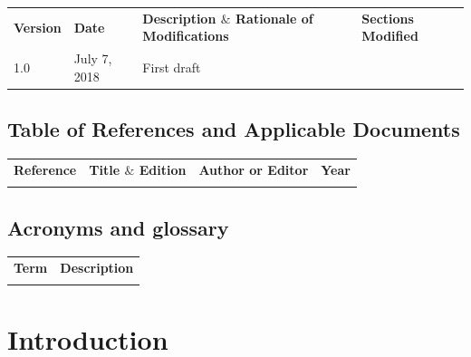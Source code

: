 \documentclass[12pt]{article}
\begin{document}
\begin{table}[H]
\large
\centering
\begin{adjustbox}{width=\textwidth}
\begin{tabular}{ |p{1.5cm}|p{2.5cm}|p{9.0cm}|p{3.0cm}| }
\hhline{----}
\textbf{Version} & \textbf{Date} & \textbf{Description  $  \&  $  Rationale of
Modifications} & \textbf{Sections Modified} \\
\hhline{----}
1.0 & July 7, 2018 & First draft &  \\ 
\hline
\end{tabular}
\end{adjustbox}
\end{table}

\subsection{Table of References and Applicable Documents}

\begin{table}[H]
\large
\centering
\begin{adjustbox}{width=\textwidth}
\begin{tabular}{ |p{2.66in}|p{2.66in}|p{0.95in}|p{0.43in}| }
\hhline{----}
\textbf{Reference} & \textbf{Title  $  \&  $  Edition} & \textbf{Author or
Editor} & \textbf{Year}
\\
\hhline{----}
 &  &  &  \\ 
\hline
\end{tabular}
\end{adjustbox}
\end{table}

\subsection{Acronyms and glossary}

\begin{table}[H]
\large
\centering
\begin{adjustbox}{width=\textwidth}
\begin{tabular}{ |p{1.24in}|p{5.45in}| }
\hhline{--}
\textbf{Term} & \textbf{Description} \\ 
\hhline{--}
 &  \\ 
\hline
\end{tabular}
\end{adjustbox}
\end{table}

\newpage
\section{Introduction}
\end{document}
